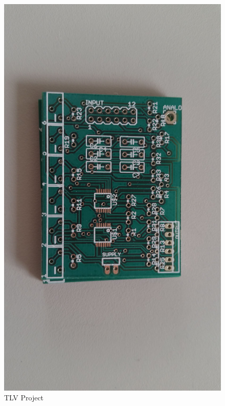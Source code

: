 \begin{figure}[!htpb]
\centering
\caption{TLV Project}
\label{TLV_board}
\includegraphics[scale=0.08]{images/TLV_board}
\end{figure}
